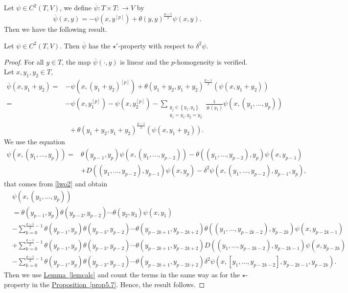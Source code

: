 \documentclass[11pt, twoside]{article}
\begin{document}
Let $\psi\in C^2(T,V) $, we define $\overline{\psi}:T\times T:\to V $ by \begin{equation}\label{psibar}
    \overline{\psi}(x,y)= -\psi(x,y^{[p]})+ \theta(y,y)^{\frac{p-1}{2}}\psi(x,y).
\end{equation} Then we have the following result. 

\begin{prop}\label{propstar'}
    Let $\psi\in C^2(T,V) $. Then $\overline{\psi} $ has the $\star'$-property with respect to $\delta^2\psi$.
\end{prop}

\begin{proof}
For all $y\in T$, the map $\overline{\psi}(\cdot,y)$ is linear and the $p$-homogeneity is verified. Let $x,y_1,y_2\in T$,
\begin{align*}
    \overline{\psi}(x,y_1+y_2)= &-\psi(x,(y_1+y_2)^{[p]})+ \theta(y_1+y_2,y_1+y_2)^{\frac{p-1}{2}}(\psi(x,y_1+y_2)) \\ =&-\psi(x,y_1^{[p]})-\psi(x,y_2^{[p]}) - \sum_{\substack{y_j\in \left\{y_1,y_2 \right\}\\y_1=y_1,y_2=y_2}}\frac{1}{\#(y_1)}\psi(x,(y_1,\ldots,y_p)) \\ & \,\,\, + \theta(y_1+y_2,y_1+y_2)^\frac{p-1}{2}(\psi(x,y_1+y_2)).
\end{align*}
    We use the equation \begin{align*}
        \psi(x,(y_1,\ldots,y_p))=&\theta(y_{p-1},y_p)\psi(x,(y_1,\ldots,y_{p-2}))-\theta((y_1,\ldots,y_{p-2}),y_p)\psi(x,y_{p-1})\\ &+ D((y_1,\ldots,y_{p-2}),y_{p-1})\psi(x,y_p)-\delta^2\psi(x,(y_1,\ldots,y_{p-2}),y_{p-1},y_p),
    \end{align*} that comes from \eqref{lwo2} and  obtain \begin{align*}
         &\psi(x,(y_1,\ldots,y_{p}))\\ &=\theta(y_{p-1},y_p)\theta(y_{p-3},y_{p-2}) \cdots\theta(y_2,y_3)\psi(x,y_1) \\& -\sum\limits_{k=0}^{\frac{p-1}{2}-1}\theta(y_{p-1},y_p)\theta(y_{p-3},y_{p-2}) \cdots\theta(y_{p-2k+1},y_{p-2k+2})\theta((y_1,\ldots,y_{p-2k-2}),y_{p-2k})\psi(x,y_{p-2k-1}) \\ &+ \sum\limits_{k=0}^{\frac{p-1}{2}-1}\theta(y_{p-1},y_p)\theta(y_{p-3},y_{p-2})\cdots\theta(y_{p-2k+1},y_{p-2k+2})D((y_1,\ldots,y_{p-2k-2}),y_{p-2k-1})\psi(x,y_{p-2k}) \\ &- \sum\limits_{k=0}^{\frac{p-1}{2}-1}\theta(y_{p-1},y_p)\theta(y_{p-3},y_{p-2})\cdots\theta(y_{p-2k+1},y_{p-2k+2}) \delta^2\psi(x,[y_1,\ldots,y_{p-2k-2}],y_{p-2k-1},y_{p-2k}). 
    \end{align*} Then we use \hyperref[lemcalc]{Lemma~\ref*{lemcalc}} and count the terms in the same way as for the $\star$-property in the \hyperref[prop5.7]{Proposition~\ref*{prop5.7}}. Hence, the result follows. 
\end{proof}
\end{document}
